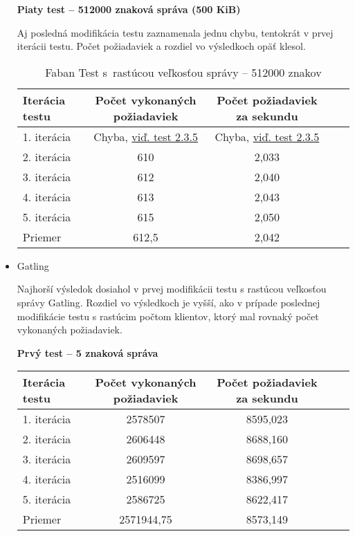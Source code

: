 \documentclass[12pt,oneside,final]{fithesis-utf8}
\begin{document}
\begin{itemize}
\textbf{Piaty test -- 512000 znaková správa (500 KiB)}

Aj posledná modifikácia testu zaznamenala jednu chybu, tentokrát v prvej iterácii testu. Počet požiadaviek a rozdiel vo výsledkoch opäť klesol.

\begin{table}[H]
\begin{center}
\begin{tabular}{ | l | c | c | c | c |}
		\hline
		 \textbf{Iterácia testu} & \textbf{Počet vykonaných požiadaviek} & \textbf{Počet požiadaviek za sekundu} \\ \hline
		 1. iterácia & Chyba, \hyperlink{label}{viď. test 2.3.5} & Chyba, \hyperlink{label}{viď. test 2.3.5} \\ \hline
		 2. iterácia & 610 & 2,033 \\ \hline
		 3. iterácia & 612 & 2,040 \\ \hline
		 4. iterácia & 613 & 2,043 \\ \hline
		 5. iterácia & 615 & 2,050 \\ \hline
		 Priemer & 612,5 & 2,042 \\ \hline
		 
\end{tabular}
\end{center}
\caption{Faban Test s~rastúcou veľkosťou správy -- 512000 znakov}
\end{table}


\item Gatling

Najhorší výsledok dosiahol v prvej modifikácii testu s rastúcou veľkosťou správy Gatling. Rozdiel vo výsledkoch je vyšší, ako v prípade poslednej modifikácie testu s rastúcim počtom klientov, ktorý mal rovnaký počet vykonaných požiadaviek. 

\textbf{Prvý test -- 5 znaková správa}

\begin{table}[H]
\begin{center}
\begin{tabular}{ | l | c | c | c | c |}
		\hline
		 \textbf{Iterácia testu} & \textbf{Počet vykonaných požiadaviek} & \textbf{Počet požiadaviek za sekundu} \\ \hline
		 1. iterácia & 2578507 & 8595,023 \\ \hline
		 2. iterácia & 2606448 & 8688,160 \\ \hline
		 3. iterácia & 2609597 & 8698,657 \\ \hline
		 4. iterácia & 2516099 & 8386,997 \\ \hline
		 5. iterácia & 2586725 & 8622,417 \\ \hline
		 Priemer & 2571944,75 & 8573,149 \\ \hline
		 

\end{tabular}
\end{center}
\end{table}
\end{itemize}
\end{document}
